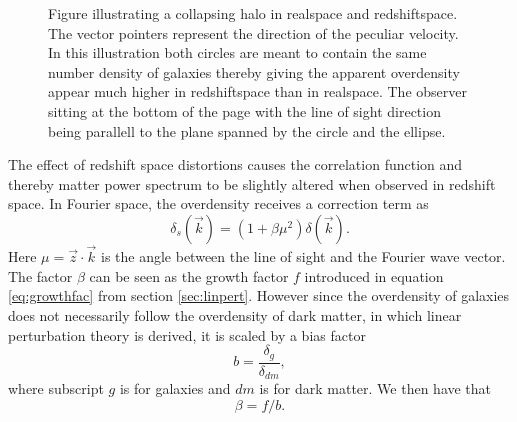\begin{figure}[htbp]
    \caption{Figure illustrating a collapsing halo in realspace and redshiftspace. The vector pointers represent the direction of the peculiar velocity. In this illustration both circles are meant to contain the same number density of galaxies thereby giving the apparent overdensity appear much higher in redshiftspace than in realspace. The observer sitting at the bottom of the page with the line of sight direction being parallell to the plane spanned by the circle and the ellipse.}
    \label{fig:rsddistortion}
\end{figure}
The effect of redshift space distortions causes the correlation function and thereby
matter power spectrum to be slightly altered when observed in redshift space. In
Fourier space, the overdensity receives a correction term as\cite[p.~279]{Dodelson:1282338}
\begin{equation}
    \delta_s(\vec{k})=(1+\beta\mu^2)\delta(\vec{k}).
\end{equation}
Here $\mu=\vec{z}\cdot\vec{k}$ is the angle
between the line of sight and the Fourier wave vector. The factor $\beta$ can be
seen as the growth factor $f$ introduced in equation \ref{eq:growthfac} from
section \ref{sec:linpert}. However since the overdensity of galaxies does not
necessarily follow the overdensity of dark matter, in which linear perturbation
theory is derived, it is scaled by a bias factor
\begin{equation}\label{eq:bias}
    b=\frac{\delta_g}{\delta_{dm}},
\end{equation}
where subscript $g$ is for galaxies and $dm$ is for dark matter. We then have
that
\begin{equation}\label{eq:beta}
    \beta=f/b.
\end{equation} 
